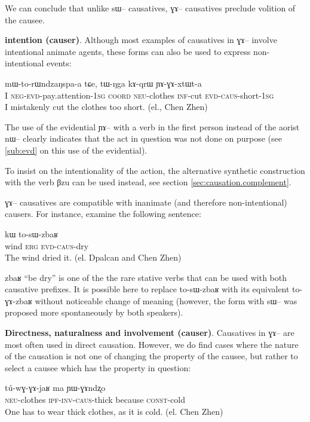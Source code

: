 \documentclass[oldfontcommands,oneside,a4paper,11pt]{memoir}
\newcommand{\ipa}[1]{{\phon #1}} %
\newcommand{\wav}[1]{}%
\newcommand{\caus}{\textsc{caus}}
\newcommand{\coord}{\textsc{coord}}
\newcommand{\const}{\textsc{const}}
\newcommand{\erg}{\textsc{erg}}
\newcommand{\evd}{\textsc{evd}}
\newcommand{\inftv}{\textsc{inf}}
\newcommand{\inv}{\textsc{inv}}
\newcommand{\ipf}{\textsc{ipf}}
\newcommand{\negat}{\textsc{neg}}
\newcommand{\neu}{\textsc{neu}}
\newcommand{\sg}{\textsc{sg}}
\begin{document}
  We can conclude that unlike \ipa{sɯ}-- causatives, \ipa{ɣɤ}-- causatives preclude volition of the causee.
  
 
 \textbf{intention (causer)}. Although most examples of causatives in \ipa{ɣɤ}-- involve intentional animate agents, these forms  can also be used to express non-intentional events:
 
 \begin{exe}
   \ex 
\gll   \ipa{aʑo}  	\ipa{mɯ-to-rɯndzaŋspa-a}  	\ipa{tɕe,}  	\ipa{tɯ-ŋga}  	\ipa{kɤ-qrɯ}  	\ipa{ɲɤ-ɣɤ-xtɯt-a}  \\
I \negat{}-\evd{}-pay.attention-1\sg{} \coord{} \neu{}-clothes \inftv{}-cut \evd{}-\caus{}-short-1\sg{} \\
 \glt   I mistakenly cut the clothes too short. (el., Chen Zhen\wav{8_GAxtWt})
   \end{exe} 
The use of the evidential \ipa{ɲɤ}--   with a verb in the first person instead of the aorist \ipa{nɯ}-- clearly indicates that the act in question was not done on purpose (see \ref{sub:evd} on this use of the evidential).
   
 To insist on the intentionality of the action, the alternative synthetic construction with the verb \ipa{βzu} can be used instead, see section \ref{sec:causation.complement}.
  
 \ipa{ɣɤ}-- causatives are compatible with inanimate (and therefore non-intentional) causers. For instance, examine the following sentence:
     \begin{exe}
   \ex 
\gll  \ipa{qale} \ipa{kɯ} \ipa{to-sɯ-zbaʁ}\\
     wind \erg{} \evd{}-\caus{}-dry \\
 \glt The wind dried it.     (el. Dpalcan and Chen Zhen)
   \end{exe}  
  \ipa{zbaʁ} ``be dry'' is one of the the rare stative verbs that can be used with both causative prefixes. It is possible here to replace \ipa{to-sɯ-zbaʁ} with its equivalent \ipa{to-ɣɤ-zbaʁ} without noticeable change of meaning (however, the form with \ipa{sɯ}-- was proposed more spontaneously by both speakers).
  
  
  \textbf{Directness, naturalness and involvement (causer)}. Causatives in \ipa{ɣɤ}-- are most often used in direct causation. However, we do find cases where the nature of the causation is not one of \ipa{changing} the property of the causee, but rather to \ipa{select} a causee which has the property in question:
     \begin{exe}
   \ex 
\gll \ipa{tɯ-ŋga}  	\ipa{tú-wɣ-ɣɤ-jaʁ}  	\ipa{ma}  	\ipa{ɲɯ-ɣɤndʐo}   \\
   \neu{}-clothes \ipf{}-\inv{}-\caus{}-thick because \const{}-cold   \\
 \glt    One has to wear thick clothes, as it is cold.  (el. Chen Zhen) \wav{8_GAjaR}
   \end{exe}  
    
\end{document}
